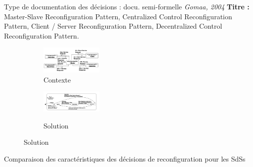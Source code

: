 \begin{frame}[fragile]{Type de documentation des décisions : docu.
semi-formelle
\emph{Gomaa, 2004}}
\textbf{Titre :} Master-Slave Reconfiguration Pattern, Centralized Control
Reconfiguration Pattern, Client / Server Reconfiguration Pattern,
Decentralized Control Reconfiguration
Pattern.
\begin{figure}
\begin{subfigure}[b]{0.5\textwidth} %
\includegraphics[width=3cm]{imgs/gomaa_contexte}
\caption{Contexte}\label{fig:orchid}
\end{subfigure}
\begin{subfigure}[b]{0.5\textwidth} %
\includegraphics[width=3cm]{imgs/gomaa_solution}\\
\caption{Solution}\label{fig:orchid}
\end{subfigure}
\end{figure}
\begin{table}
\end{table}
\end{frame}
%
\begin{frame}{Comparaison des caractéristiques des décisions de reconfiguration
pour les SdSs}
\begin{table}[]
\centering
{}
\end{table}
\end{frame}


